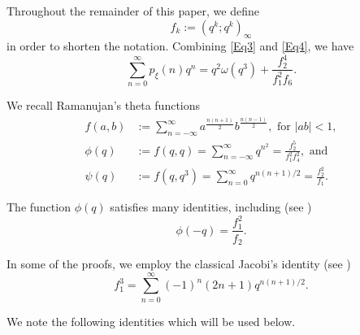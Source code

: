 \documentclass[12pt]{article}
\begin{document}
Throughout the remainder of this paper, we define 
$$f_k := (q^k;q^k)_{\infty}$$
in order to shorten the notation. Combining \eqref{Eq3} and \eqref{Eq4}, we have
\begin{equation}
\sum_{n=0}^{\infty} p_{\xi}(n)q^n = q^2\omega(q^3) + \frac{f_2^{4}}{f_1^2f_6}.
\label{Eq5}
\end{equation}

We recall Ramanujan's theta functions
\begin{align}
f(a,b) & :=\sum_{n=-\infty}^\infty a^\frac{n(n+1)}{2}b^\frac{n(n-1)}{2}, \mbox{ for } |ab|<1, \nonumber \\
\phi(q) & := f(q,q) = \sum_{n=-\infty}^{\infty} q^{n^2} = \frac{f_2^5}{f_1^2f_4^2}, \textrm{\ \ and} \label{Rama1} \\
\psi(q) & := f(q,q^3) = \sum_{n=0}^{\infty} q^{n(n+1)/2} = \frac{f_2^2}{f_1}. \label{Rama2}
\end{align}

The function $\phi(q)$ satisfies many identities, including (see \cite[(22.4)]{Berndt})
\begin{equation}
{\phi(-q)} = \frac{f_1^2}{f_2}. \label{Eq18}
\end{equation}


In some of the proofs, we employ the classical Jacobi's identity (see \cite[Theorem 1.3.9]{Berndt1})
\begin{equation}
f_1^3 = \sum_{n=0}^{\infty} (-1)^n (2n+1) q^{n(n+1)/2}.
\label{Jacobi}
\end{equation}

We note the following identities which will be used below.  
\end{document}
